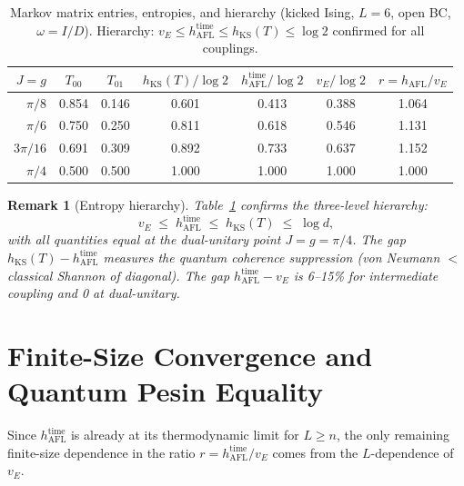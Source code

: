 \documentclass[12pt,a4paper]{article}
\newtheorem{remark}[theorem]{Remark}
\begin{document}
\begin{table}[h!]
\centering
\caption{Markov matrix entries, entropies, and hierarchy
(kicked Ising, $L=6$, open BC, $\omega = I/D$).
Hierarchy: $v_E \leq h_{\mathrm{AFL}}^{\mathrm{time}}
\leq h_{\mathrm{KS}}(T) \leq \log 2$ confirmed for all couplings.}
\label{tab:markov_hierarchy}
\begin{tabular}{r|cc|c|c|c|c}
\hline
$J=g$ & $T_{00}$ & $T_{01}$ & $h_{\mathrm{KS}}(T)/\log 2$
      & $h_{\mathrm{AFL}}^{\mathrm{time}}/\log 2$
      & $v_E/\log 2$ & $r = h_{\mathrm{AFL}}/v_E$ \\
\hline
$\pi/8$   & 0.854 & 0.146 & 0.601 & 0.413 & 0.388 & 1.064 \\
$\pi/6$   & 0.750 & 0.250 & 0.811 & 0.618 & 0.546 & 1.131 \\
$3\pi/16$ & 0.691 & 0.309 & 0.892 & 0.733 & 0.637 & 1.152 \\
$\pi/4$   & 0.500 & 0.500 & 1.000 & 1.000 & 1.000 & 1.000 \\
\hline
\end{tabular}
\end{table}

\begin{remark}[Entropy hierarchy]
  Table~\ref{tab:markov_hierarchy} confirms the three-level hierarchy:
  \[
    v_E \;\leq\; h_{\mathrm{AFL}}^{\mathrm{time}}
    \;\leq\; h_{\mathrm{KS}}(T) \;\leq\; \log d,
  \]
  with all quantities equal at the dual-unitary point $J{=}g{=}\pi/4$.
  The gap $h_{\mathrm{KS}}(T) - h_{\mathrm{AFL}}^{\mathrm{time}}$
  measures the quantum coherence suppression (von Neumann $<$ classical
  Shannon of diagonal). The gap $h_{\mathrm{AFL}}^{\mathrm{time}} - v_E$
  is 6--15\% for intermediate coupling and 0 at dual-unitary.
\end{remark}

\section{Finite-Size Convergence and Quantum Pesin Equality}
\label{sec:finite_size_conv}

Since $h_{\mathrm{AFL}}^{\mathrm{time}}$ is already at its
thermodynamic limit for $L \geq n$, the only remaining finite-size
dependence in the ratio $r = h_{\mathrm{AFL}}^{\mathrm{time}}/v_E$
comes from the $L$-dependence of $v_E$.
\end{document}
